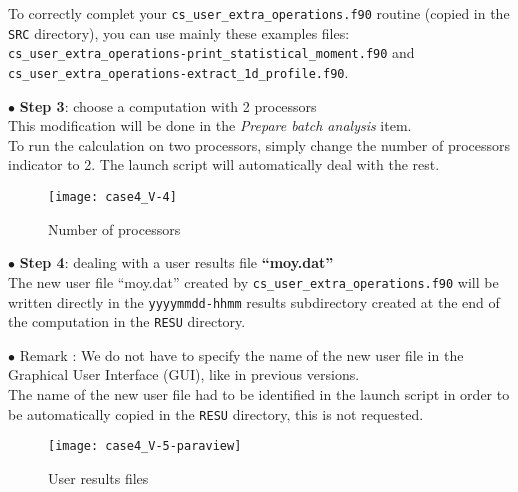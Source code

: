 To correctly complet your \texttt{cs\_user\_extra\_operations.f90} routine
(copied in the \texttt{SRC} directory), you can use mainly these examples files:
\texttt{cs\_user\_extra\_operations-print\_statistical\_moment.f90} and
\texttt{cs\_user\_extra\_operations-extract\_1d\_profile.f90}.

$\bullet$ \textbf{Step 3}: choose a computation with 2 processors \\
This modification will be done in the {\itshape Prepare batch analysis} item.\\
To run the calculation on two processors, simply change the number of processors
indicator to 2. The launch script will automatically deal with the rest.

\begin{figure}[h!]
\begin{center}
\texttt{[image: case4\_V-4]} %
\caption{Number of processors}
\label{fig1_e4}
\end{center}
\end{figure}

\newpage
$\bullet$ \textbf{Step 4}:  dealing with a user results file \textbf{``moy.dat''}\\
The new user file ``moy.dat'' created by \texttt{cs\_user\_extra\_operations.f90}
will be written directly in the \texttt{yyyymmdd-hhmm} results subdirectory created
at the end of the computation in the \texttt{RESU} directory.

$\bullet$ Remark : We do not have to specify the name of the new user file in the
Graphical User Interface (GUI), like in previous \CS versions. \\
The name of the new user file had to be identified in the launch script in order
to be automatically copied in the \texttt{RESU} directory, this is not requested.

\begin{figure}[h!]
\begin{center}
\texttt{[image: case4\_V-5-paraview]}
\caption{User results files}
\label{fig2_e4}
\end{center}
\end{figure}


